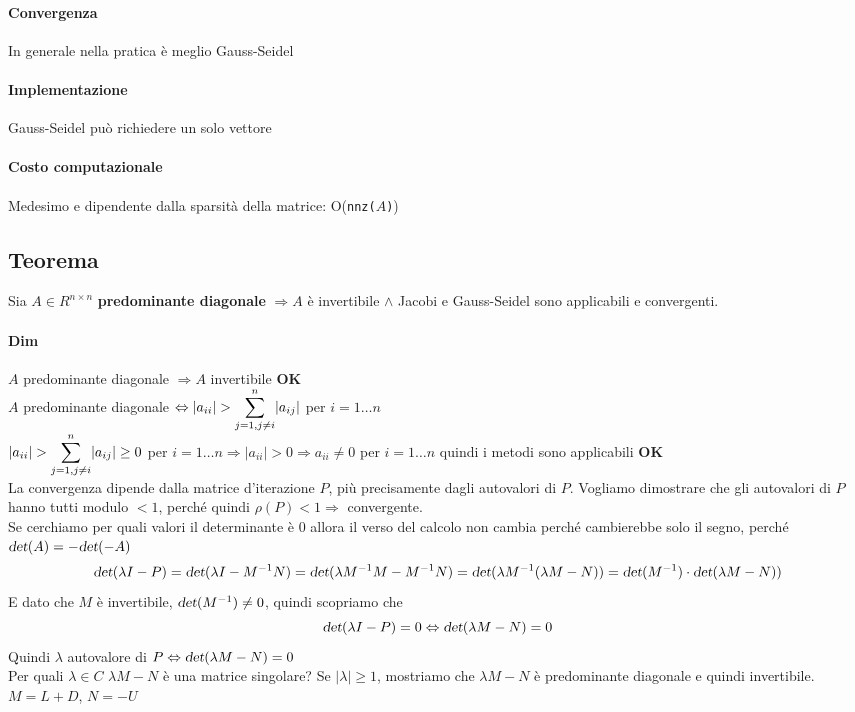 \documentclass[10pt]{book}
\begin{document}
\paragraph{Convergenza} In generale nella pratica è meglio Gauss-Seidel
\paragraph{Implementazione} Gauss-Seidel può richiedere un solo vettore
\paragraph{Costo computazionale} Medesimo e dipendente dalla sparsità della matrice: O(\texttt{nnz(}$A$\texttt{)})
\subsection{Teorema} Sia $A \in R^{n \times n}$ \textbf{predominante diagonale} $\Rightarrow A$ è invertibile $\wedge$ Jacobi e Gauss-Seidel sono applicabili e convergenti.
\paragraph{Dim} $A$ predominante diagonale $\Rightarrow A$ invertibile \textbf{OK}\\
$A$ predominante diagonale $\Leftrightarrow |a_{ii}| > \mathlarger{\sum_{j=1, j\neq i}^n} |a_{ij}|$ per $i=1\ldots n$\\
$|a_{ii}| > \mathlarger{\sum_{j=1, j\neq i}^n} |a_{ij}| \geq 0$ per $i=1\ldots n \Rightarrow |a_{ii}| > 0 \Rightarrow a_{ii} \neq 0$ per $i=1\ldots n$ quindi i metodi sono applicabili \textbf{OK}\\
La convergenza dipende dalla matrice d'iterazione $P$, più precisamente dagli autovalori di $P$. Vogliamo dimostrare che gli autovalori di $P$ hanno tutti modulo $< 1$, perché quindi $\rho(P) < 1 \Rightarrow$ convergente.\\
Se cerchiamo per quali valori il determinante è 0 allora il verso del calcolo non cambia perché cambierebbe solo il segno, perché $\textsl{det}(A) = -\textsl{det}(-A)$
$$\textsl{det}(\lambda I - P) = \textsl{det}(\lambda I - M^{-1}N) = \textsl{det}(\lambda M^{-1}M - M^{-1}N) = \textsl{det}(\lambda M^{-1}(\lambda M - N)) = \textsl{det}(M^{-1})\cdot\textsl{det}(\lambda M - N))$$
E dato che $M$ è invertibile, $\textsl{det}(M^{-1})\neq 0$, quindi scopriamo che
$$\textsl{det}(\lambda I - P) = 0 \Leftrightarrow \textsl{det}(\lambda M - N) = 0$$
Quindi $\lambda$ autovalore di $P \Leftrightarrow \textsl{det}(\lambda M - N) = 0$\\
Per quali $\lambda \in C$ $\lambda M - N$ è una matrice singolare? Se $|\lambda|\geq 1$, mostriamo che $\lambda M - N$ è predominante diagonale e quindi invertibile.\\
$M = L + D$, $N = - U$ %
\end{document}
